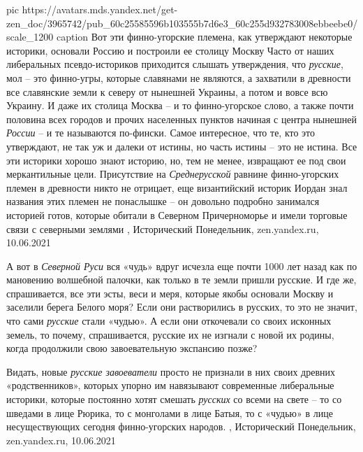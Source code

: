 \ifcmt
  pic https://avatars.mds.yandex.net/get-zen_doc/3965742/pub_60c25585596b103555b7d6e3_60c255d932783008ebbeebe0/scale_1200
	caption Вот эти финно-угорские племена, как утверждают некоторые историки, основали Россию и построили ее столицу Москву
\fi
Часто от наших либеральных псевдо-историков приходится слышать утверждения, что
\emph{русские}, мол – это финно-угры, которые славянами не являются, а
захватили в древности все славянские земли к северу от нынешней Украины, а
потом и вовсе всю Украину. И даже их столица Москва – и то финно-угорское
слово, а также почти половина всех городов и прочих населенных пунктов начиная
с центра нынешней \emph{России} – и те называются по-фински.  Самое интересное,
что те, кто это утверждают, не так уж и далеки от истины, но часть истины – это
не истина. Все эти историки хорошо знают историю, но, тем не менее, извращают
ее под свои меркантильные цели. Присутствие на \emph{Среднерусской} равнине
финно-угорских племен в древности никто не отрицает, еще византийский историк
Иордан знал названия этих племен не понаслышке – он довольно подробно занимался
историей готов, которые обитали в Северном Причерноморье и имели торговые связи
с северными землями
, 
Исторический Понедельник, zen.yandex.ru, 10.06.2021

А вот в \emph{Северной Руси} вся «чудь» вдруг исчезла еще почти 1000 лет назад
как по мановению волшебной палочки, как только в те земли пришли русские. И где
же, спрашивается, все эти эсты, веси и меря, которые якобы основали Москву и
заселили берега Белого моря? Если они растворились в русских, то это не значит,
что сами \emph{русские} стали «чудью». А если они откочевали со своих исконных земель,
то почему, спрашивается, русские их не изгнали с новой их родины, когда
продолжили свою завоевательную экспансию позже?

Видать, новые \emph{русские завоеватели} просто не признали в них своих древних
«родственников», которых упорно им навязывают современные либеральные историки,
которые постоянно хотят смешать \emph{русских} со всеми на свете – то со
шведами в лице Рюрика, то с монголами в лице Батыя, то с «чудью» в лице
несуществующих сегодня финно-угорских народов.
, 
Исторический Понедельник, zen.yandex.ru, 10.06.2021


